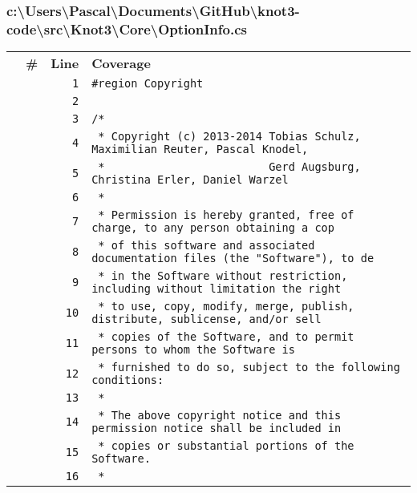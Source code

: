 \documentclass[a4paper,10pt]{article}
\begin{document}
\subsubsection{c:\textbackslash Users\textbackslash Pascal\textbackslash Documents\textbackslash GitHub\textbackslash knot3-code\textbackslash src\textbackslash Knot3\textbackslash Core\textbackslash OptionInfo.cs}
\begin{longtable}[l]{lrrl}
\textbf{} & \textbf{\#} & \textbf{Line} & \textbf{Coverage}\\
\cellcolor{gray} &  & \verb~1~ & \verb~#region Copyright~\\
\cellcolor{gray} &  & \verb~2~ & \verb~~\\
\cellcolor{gray} &  & \verb~3~ & \verb~/*~\\
\cellcolor{gray} &  & \verb~4~ & \verb~ * Copyright (c) 2013-2014 Tobias Schulz, Maximilian Reuter, Pascal Knodel,~\\
\cellcolor{gray} &  & \verb~5~ & \verb~ *                         Gerd Augsburg, Christina Erler, Daniel Warzel~\\
\cellcolor{gray} &  & \verb~6~ & \verb~ *~\\
\cellcolor{gray} &  & \verb~7~ & \verb~ * Permission is hereby granted, free of charge, to any person obtaining a cop~\\
\cellcolor{gray} &  & \verb~8~ & \verb~ * of this software and associated documentation files (the "Software"), to de~\\
\cellcolor{gray} &  & \verb~9~ & \verb~ * in the Software without restriction, including without limitation the right~\\
\cellcolor{gray} &  & \verb~10~ & \verb~ * to use, copy, modify, merge, publish, distribute, sublicense, and/or sell~\\
\cellcolor{gray} &  & \verb~11~ & \verb~ * copies of the Software, and to permit persons to whom the Software is~\\
\cellcolor{gray} &  & \verb~12~ & \verb~ * furnished to do so, subject to the following conditions:~\\
\cellcolor{gray} &  & \verb~13~ & \verb~ *~\\
\cellcolor{gray} &  & \verb~14~ & \verb~ * The above copyright notice and this permission notice shall be included in ~\\
\cellcolor{gray} &  & \verb~15~ & \verb~ * copies or substantial portions of the Software.~\\
\cellcolor{gray} &  & \verb~16~ & \verb~ *~\\

\end{longtable}
\end{document}
